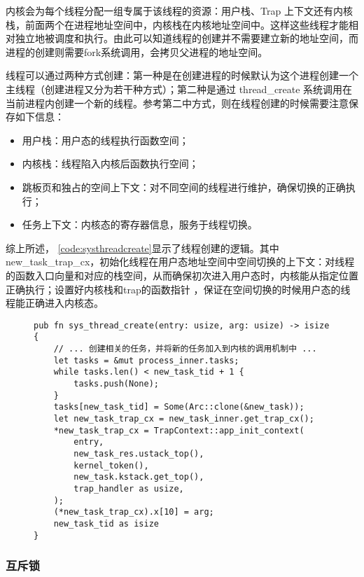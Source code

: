 内核会为每个线程分配一组专属于该线程的资源：用户栈、Trap 上下文还有内核栈，前面两个在进程地址空间中，内核栈在内核地址空间中。这样这些线程才能相对独立地被调度和执行。由此可以知道线程的创建并不需要建立新的地址空间，而进程的创建则需要fork系统调用，会拷贝父进程的地址空间。

线程可以通过两种方式创建：第一种是在创建进程的时候默认为这个进程创建一个主线程（创建进程又分为若干种方式）；第二种是通过 thread\_create 系统调用在当前进程内创建一个新的线程。参考第二中方式，则在线程创建的时候需要注意保存如下信息： 
\begin{itemize}
\item 用户栈：用户态的线程执行函数空间；
\item 内核栈：线程陷入内核后函数执行空间；
\item 跳板页和独占的空间上下文：对不同空间的线程进行维护，确保切换的正确执行；
\item 任务上下文：内核态的寄存器信息，服务于线程切换。
\end{itemize}


综上所述， \autoref{code:systhreadcreate}显示了线程创建的逻辑。其中new\_task\_trap\_cx，初始化线程在用户态地址空间中空间切换的上下文：对线程的函数入口向量和对应的栈空间，从而确保初次进入用户态时，内核能从指定位置正确执行；设置好内核栈和trap的函数指针 ，保证在空间切换的时候用户态的线程能正确进入内核态。

\begin{figure}[h]
\begin{lstlisting}[caption=sys\_thread\_create的系统调用, label=code:systhreadcreate]
pub fn sys_thread_create(entry: usize, arg: usize) -> isize {
    // ... 创建相关的任务，并将新的任务加入到内核的调用机制中 ...
    let tasks = &mut process_inner.tasks;
    while tasks.len() < new_task_tid + 1 {
        tasks.push(None);
    }
    tasks[new_task_tid] = Some(Arc::clone(&new_task));
    let new_task_trap_cx = new_task_inner.get_trap_cx();
    *new_task_trap_cx = TrapContext::app_init_context(
        entry,
        new_task_res.ustack_top(),
        kernel_token(),
        new_task.kstack.get_top(),
        trap_handler as usize,
    );
    (*new_task_trap_cx).x[10] = arg;
    new_task_tid as isize
}
\end{lstlisting}
\end{figure}

\subsubsection{互斥锁}


